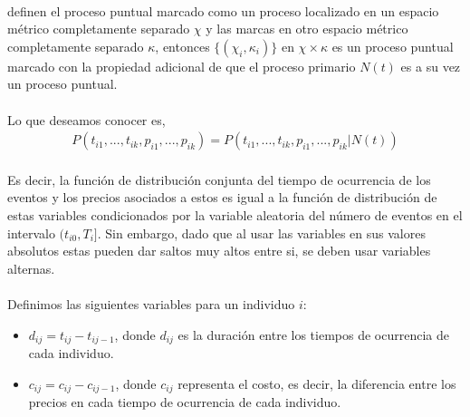 \\
\cite{daley2003} definen el proceso puntual marcado como un proceso localizado en un espacio m\'etrico completamente separado $\chi$ y las marcas en otro espacio m\'etrico completamente separado $\kappa$, entonces $\{(\chi_i,\kappa_i)\}$ en $\chi \times \kappa$ es un proceso puntual marcado con la propiedad adicional de que el proceso primario $N(t)$ es a su vez un proceso puntual.\\
\\
Lo que deseamos conocer es,
\begin{align}
P(t_{i1},...,t_{ik},p_{i1},...,p_{ik})=P(t_{i1},...,t_{ik},p_{i1},...,p_{ik}|N(t))
\end{align}
\\
Es decir, la funci\'on de distribuci\'on conjunta del tiempo de ocurrencia de los eventos y los precios asociados a estos es igual a la funci\'on de distribuci\'on de estas variables condicionados por la variable aleatoria del n\'umero de eventos en el intervalo $(t_{i0},T_i]$. Sin embargo, dado que al usar las variables en sus valores absolutos estas pueden dar saltos muy altos entre si, se deben usar variables alternas.\\
\\
Definimos las siguientes variables para un individuo $i$:
\begin{itemize}
\item $d_{ij}=t_{ij}-t_{ij-1}$, donde $d_{ij}$ es la duraci\'on entre los tiempos de ocurrencia de cada individuo.
\item $c_{ij}=c_{ij}-c_{ij-1}$, donde $c_{ij}$ representa el costo, es decir, la diferencia entre los precios en cada tiempo de ocurrencia de cada individuo.
\end{itemize}
